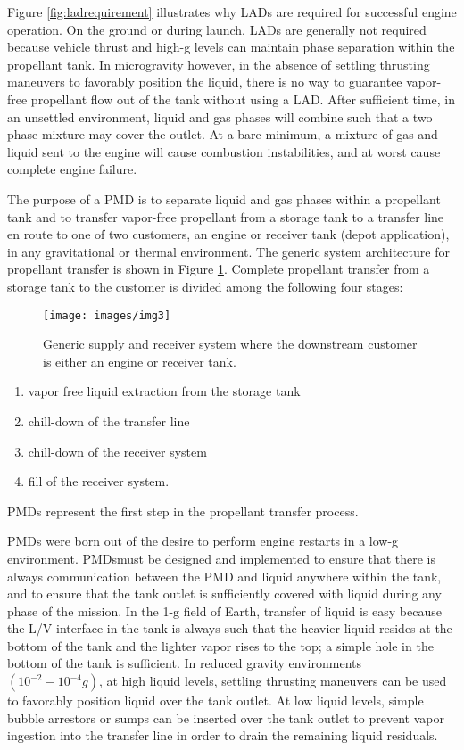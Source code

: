 \documentclass[12pt,twoside]{report}
\begin{document}
Figure \ref{fig:ladrequirement} illustrates why LADs are required for successful engine operation. On the
ground or during launch, LADs are generally not required because vehicle thrust and high-g levels can maintain phase separation within the propellant tank. In microgravity however, in the absence of settling thrusting maneuvers to favorably position the liquid, there is no way to guarantee vapor-free propellant flow out of the tank without using a LAD. After sufficient time, in an unsettled environment, liquid and gas phases will combine such that a two phase mixture may cover the outlet. At a bare minimum, a mixture of gas and liquid sent to the engine will cause combustion instabilities, and at worst cause complete engine failure. \par

The purpose of a PMD is to separate liquid and gas phases within a propellant tank and to transfer vapor-free propellant from a storage tank to a transfer line en route to one of two customers, an engine or receiver tank (depot application), in any gravitational or thermal environment. The generic system architecture for propellant transfer is shown in Figure \ref{fig:img3}. Complete propellant transfer from a storage tank to the customer is divided among the following four stages:

\begin{figure}[h]
	\centering
	\texttt{[image: images/img3]}
	\caption{Generic supply and receiver system where the downstream customer is either an engine or receiver tank.}
	\label{fig:img3}
\end{figure}

\begin{enumerate}
	\item vapor free liquid extraction from the storage tank
	\item chill-down of the transfer line
	\item chill-down of the receiver system
	\item fill of the receiver system.
\end{enumerate}


PMDs represent the first step in the propellant transfer process.\par
PMDs were born out of the desire to perform engine restarts in a low-g environment. PMDsmust be designed and implemented
to ensure that there is always communication between the PMD and liquid anywhere
within the tank, and to ensure that the tank outlet is sufficiently covered with liquid during
any phase of the mission. In the 1-g field of Earth, transfer of liquid is easy because the L/V
interface in the tank is always such that the heavier liquid resides at the bottom of the tank
and the lighter vapor rises to the top; a simple hole in the bottom of the tank is sufficient.
In reduced gravity environments $(10^{-2}-10^{-4}g)$, at high liquid levels, settling thrusting
maneuvers can be used to favorably position liquid over the tank outlet. At low liquid
levels, simple bubble arrestors or sumps can be inserted over the tank outlet to prevent
vapor ingestion into the transfer line in order to drain the remaining liquid residuals.\par
	
\end{document}
